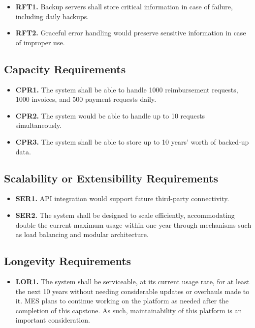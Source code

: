 \documentclass[12pt]{article}
\begin{document}
\label{RFT}

\begin{itemize}
    \item \textbf{RFT1.} Backup servers shall store critical information in case of failure, including daily backups.
    \item \textbf{RFT2.} Graceful error handling would preserve sensitive information in case of improper use.
\end{itemize}

\subsection{Capacity Requirements}

\label{CPR}

\begin{itemize}
    \item \textbf{CPR1.} The system shall be able to handle 1000 reimbursement requests, 1000 invoices, and 500 payment requests daily.
    \item \textbf{CPR2.} The system would be able to handle up to 10 requests simultaneously.
    \item \textbf{CPR3.} The system shall be able to store up to 10 years’ worth of backed-up data.
\end{itemize}

\subsection{Scalability or Extensibility Requirements}

\label{SER}

\begin{itemize}
    \item \textbf{SER1.} API integration would support future third-party connectivity.
    \item \textbf{SER2.} The system shall be designed to scale efficiently, accommodating double the current maximum usage within one year through mechanisms such as load balancing and modular architecture.
\end{itemize}

\subsection{Longevity Requirements}

\label{LOR}

\begin{itemize}
    \item \textbf{LOR1.} The system shall be serviceable, at its current usage rate, for at least the next 10 years without needing considerable updates or overhauls made to it. MES plans to continue working on the platform as needed after the completion of this capstone. As such, maintainability of this platform is an important consideration.
\end{itemize}
\end{document}
